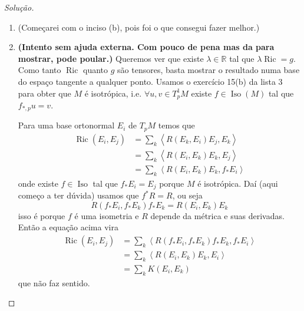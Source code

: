 \begin{proof}[Solução]\leavevmode
\begin{enumerate}[label=(\alph*)]
\item (Começarei com o inciso (b), pois foi o que consegui fazer melhor.)
\item \textbf{(Intento sem ajuda externa. Com pouco de pena mas da para mostrar, pode poular.)} Queremos ver que existe \(\lambda\in \mathbb{R}\) tal que \(\lambda\operatorname{Ric}=g\). Como tanto \(\operatorname{Ric}\) quanto \(g\) são tensores, basta mostrar o resultado numa base do espaço tangente a qualquer ponto. Usamos o exercício 15(b) da lista 3 para obter que \(M\) é isotrópica, i.e. \(\forall u,v \in T^1_pM\) existe \(f \in \operatorname{Iso}(M)\) tal que \(f_{*,p}u=v\).

	Para uma base ortonormal \(E_i\) de \(T_pM\) temos que
	\begin{align*}
	\operatorname{Ric}(E_i,E_j)&=\sum_{k}\left<R(E_k,E_i)E_j,E_k\right>\\
	&=\sum_{k}\left<R(E_i,E_k)E_k,E_j\right>\\
	&=\sum_{k}\left<R(E_i,E_k)E_k,f_{*}E_i\right>
	\end{align*}
onde existe \(f\in \operatorname{Iso}\)	tal que \(f_*E_i=E_j\) porque \(M\) é isotrópica. Daí (aqui começo a ter dúvida) usamos que \(f^*R=R\), ou seja
\[R(f_*E_i,f_*E_k)f_*E_k=R(E_i,E_k)E_k\]
isso é porque \(f\) é uma isometria e \(R\) depende da métrica e suas derivadas. Então a equação acima vira
\begin{align*}\operatorname{Ric}(E_i,E_j)&=\sum_{k}\left<R(f_*E_i,f_*E_k)f_*E_k,f_*E_i\right>\\&=\sum_{k}\left<R(E_i,E_k)E_k,E_i\right>\\
&=\sum_{k}K(E_i,E_k)\end{align*}
que não faz sentido.


\end{enumerate}
\end{proof}
